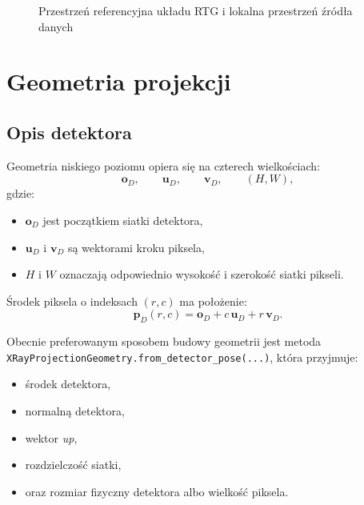 \documentclass[12pt,a4paper]{article}
\begin{document}
\begin{figure}[H]
\centering
{}
\caption{Przestrzeń referencyjna układu RTG i lokalna przestrzeń źródła danych}
\end{figure}

\section{Geometria projekcji}

\subsection{Opis detektora}

Geometria niskiego poziomu opiera się na czterech wielkościach:
\[
  \mathbf{o}_D,\qquad \mathbf{u}_D,\qquad \mathbf{v}_D,\qquad (H,W),
\]
gdzie:
\begin{itemize}
  \item \(\mathbf{o}_D\) jest początkiem siatki detektora,
  \item \(\mathbf{u}_D\) i \(\mathbf{v}_D\) są wektorami kroku piksela,
  \item \(H\) i \(W\) oznaczają odpowiednio wysokość i szerokość siatki pikseli.
\end{itemize}

Środek piksela o indeksach \((r,c)\) ma położenie:
\[
  \mathbf{p}_D(r,c) =
  \mathbf{o}_D + c\,\mathbf{u}_D + r\,\mathbf{v}_D.
\]

Obecnie preferowanym sposobem budowy geometrii jest metoda
\texttt{XRayProjectionGeometry.from\_detector\_pose(...)}, która przyjmuje:
\begin{itemize}
  \item środek detektora,
  \item normalną detektora,
  \item wektor \emph{up},
  \item rozdzielczość siatki,
  \item oraz rozmiar fizyczny detektora albo wielkość piksela.
\end{itemize}
\end{document}

